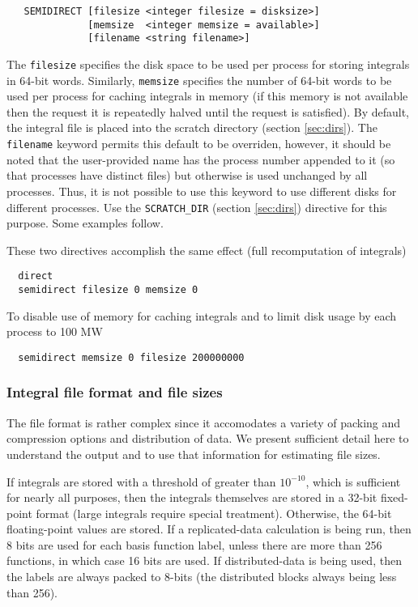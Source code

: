 \begin{verbatim}
   SEMIDIRECT [filesize <integer filesize = disksize>] 
              [memsize  <integer memsize = available>]
              [filename <string filename>]
\end{verbatim}
The \verb+filesize+ specifies the disk space to be used per process
for storing integrals in 64-bit words.  Similarly, \verb+memsize+
specifies the number of 64-bit words to be used per process for
caching integrals in memory (if this memory is not available then the
request it is repeatedly halved until the request is satisfied).  By
default, the integral file is placed into the scratch directory
(section \ref{sec:dirs}). The \verb+filename+ keyword permits this
default to be overriden, however, it should be noted that the
user-provided name has the process number appended to it (so that
processes have distinct files) but otherwise is used unchanged by all
processes.  Thus, it is not possible to use this keyword to use
different disks for different processes.  Use the \verb+SCRATCH_DIR+
(section \ref{sec:dirs}) directive for this purpose.  Some examples
follow.

These two directives accomplish the same effect (full recomputation of
integrals)
\begin{verbatim}
  direct
  semidirect filesize 0 memsize 0
\end{verbatim}

To disable use of memory for caching integrals and to limit disk
usage by each process to 100 MW
\begin{verbatim}
  semidirect memsize 0 filesize 200000000
\end{verbatim}


\subsubsection{Integral file format and file sizes}

The file format is rather complex since it accomodates a variety of
packing and compression options and distribution of data.  We present
sufficient detail here to understand the output and to use that
information for estimating file sizes.

If integrals are stored with a threshold of greater than $10^{-10}$,
which is sufficient for nearly all purposes, then the integrals
themselves are stored in a 32-bit fixed-point format (large integrals
require special treatment).  Otherwise, the 64-bit floating-point
values are stored.  If a replicated-data calculation is being run,
then 8 bits are used for each basis function label, unless there are
more than 256 functions, in which case 16 bits are used.  If
distributed-data is being used, then the labels are always packed to
8-bits (the distributed blocks always being less than 256).

